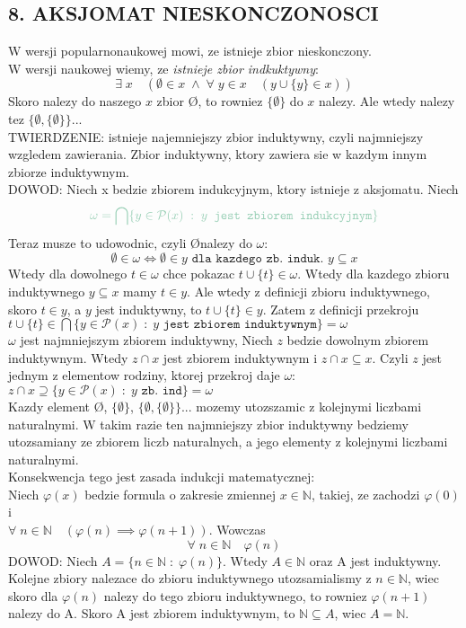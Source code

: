 \documentclass{article}
\newcommand{\N}{\mathbb{N}}
\newcommand{\Po}{\mathcal{P}}
\begin{document}
\subsection*{8. AKSJOMAT NIESKONCZONOSCI}
  W wersji popularnonaukowej mowi, ze istnieje zbior nieskonczony.\medskip\\
  W wersji naukowej wiemy, ze \color{emp}\emph{istnieje zbior indkuktywny}:\color{txt}
  $$\exists\;x\quad (\emptyset\in x\;\land\;\forall\;y\in x \quad(y\cup\{y\}\in x))$$
  Skoro nalezy do naszego $x$ zbior \O, to rowniez $\{\emptyset\}$ do $x$ nalezy. Ale wtedy nalezy tez $\{\emptyset,\{\emptyset\}\}$...\bigskip\\
  \color{def}TWIERDZENIE: \color{txt}istnieje najemniejszy zbior induktywny, czyli najmniejszy wzgledem zawierania. Zbior induktywny, ktory zawiera sie w kazdym innym zbiorze induktywnym.\medskip\\
  \color{acc}DOWOD\color{txt}: Niech x bedzie zbiorem indukcyjnym, ktory istnieje z aksjomatu. Niech
    $$\color{emp}\omega = \bigcap\{y\in\Po(x)\;:\; y\texttt{ jest zbiorem indukcyjnym}\}$$
  Teraz musze to udowodnic, czyli \O nalezy do $\omega$:
    $$\emptyset\in\omega\iff\emptyset\in y \texttt{ dla kazdego zb. induk. }y\subseteq x$$
  Wtedy dla dowolnego $t\in\omega$ chce pokazac $t\cup\{t\}\in\omega$. Wtedy dla kazdego zbioru induktywnego $y\subseteq x$ mamy $t\in y$. Ale wtedy z definicji zbioru induktywnego, skoro $t\in y$, a $y$ jest induktywny, to $t\cup\{t\}\in y$. Zatem z definicji przekroju $t\cup\{t\}\in\bigcap \{y\in\Po(x)\;:\;y\texttt{ jest zbiorem induktywnym}\}=\omega$\\
  $\omega$ jest najmniejszym zbiorem induktywny, Niech $z$ bedzie dowolnym zbiorem induktywnym. Wtedy $z\cap x$ jest zbiorem induktywnym i $z\cap x\subseteq x$. Czyli $z$ jest jednym z elementow rodziny, ktorej przekroj daje $\omega$: $z\cap x\supseteq \{y\in\Po(x)\;:\;y\texttt{ zb. ind}\} = \omega$\bigskip\\
  Kazdy element \O, $\{\emptyset\}$, $\{\emptyset,\{\emptyset\}\}$... mozemy utozszamic z \color{acc}kolejnymi liczbami naturalnymi\color{txt}. W takim razie ten najmniejszy zbior induktywny bedziemy utozsamiany ze zbiorem liczb naturalnych, a jego elementy z kolejnymi liczbami naturalnymi.\medskip\\
  Konsekwencja tego jest \color{emp}zasada indukcji matematycznej\color{txt}:\smallskip\\
  Niech $\varphi(x)$ bedzie formula o zakresie zmiennej $x\in \N$, takiej, ze zachodzi $\varphi(0)$ i \\$\forall\;n\in\N\quad(\varphi(n)\implies\varphi(n+1))$. Wowczas
  $$\forall\;n\in\N\quad\varphi(n)$$
  \color{acc}DOWOD: \color{txt}Niech $A=\{n\in\N\;:\;\varphi(n)\}$. Wtedy $A\in\N$ oraz A jest induktywny. Kolejne zbiory nalezace do zbioru induktywnego utozsamialismy z $n\in\N$, wiec skoro dla $\varphi(n)$ nalezy do tego zbioru induktywnego, to rowniez $\varphi(n+1)$ nalezy do A. Skoro A jest zbiorem induktywnym, to $\N\subseteq A$, wiec $A=\N$.
\end{document}
